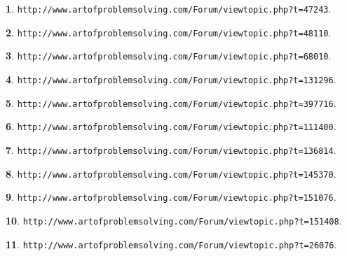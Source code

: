 \documentclass{article}
\theoremstyle{definition}
\newtheorem{s}{}
\begin{document}
\begin{s}
\texttt{http://www.artofproblemsolving.com/Forum/viewtopic.php?t=47243}.
\end{s}


\begin{s}
\texttt{http://www.artofproblemsolving.com/Forum/viewtopic.php?t=48110}.
\end{s}




\begin{s}
\texttt{http://www.artofproblemsolving.com/Forum/viewtopic.php?t=68010}.
\end{s}




\begin{s}
\texttt{http://www.artofproblemsolving.com/Forum/viewtopic.php?t=131296}.
\end{s}




\begin{s}
\texttt{http://www.artofproblemsolving.com/Forum/viewtopic.php?t=397716}.
\end{s}




\begin{s}
\texttt{http://www.artofproblemsolving.com/Forum/viewtopic.php?t=111400}.
\end{s}




\begin{s}
\texttt{http://www.artofproblemsolving.com/Forum/viewtopic.php?t=136814}.
\end{s}




\begin{s}
\texttt{http://www.artofproblemsolving.com/Forum/viewtopic.php?t=145370}.
\end{s}




\begin{s}
\texttt{http://www.artofproblemsolving.com/Forum/viewtopic.php?t=151076}.
\end{s}



\begin{s}
\texttt{http://www.artofproblemsolving.com/Forum/viewtopic.php?t=151408}.
\end{s}




\begin{s}
\texttt{http://www.artofproblemsolving.com/Forum/viewtopic.php?t=26076}.
\end{s}
\end{document}
